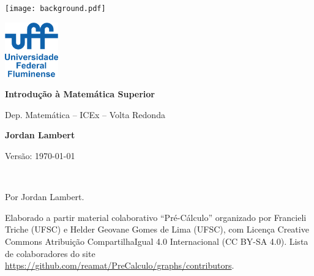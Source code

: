 
\titlepage %
	{\texttt{[image: background.pdf]}} %
	{ %
		\centering\sffamily %
        \includegraphics[width=2.3cm]{./Images/logouff_vertical_azul.png}
        
		\vspace{16pt} %
		{\Huge\bfseries Introdução à Matemática Superior\par} %
		\vspace{10pt} %
		{\LARGE Dep. Matemática -- ICEx -- Volta Redonda\par} %
        \vspace{16pt} %
  
		{\huge\bfseries Jordan Lambert \par} %
        \vspace{5pt}
        {Versão: \today\par}
	}






\thispagestyle{empty} %

~\vfill %

\noindent Por Jordan Lambert.

\vspace{.5cm}
\noindent Elaborado a partir material colaborativo ``Pré-Cálculo'' organizado por Francieli Triche (UFSC) e Helder Geovane Gomes de Lima (UFSC), com Licença Creative Commons Atribuição CompartilhaIgual 4.0 Internacional (CC BY-SA 4.0). Lista de colaboradores do site \url{https://github.com/reamat/PreCalculo/graphs/contributors}.

